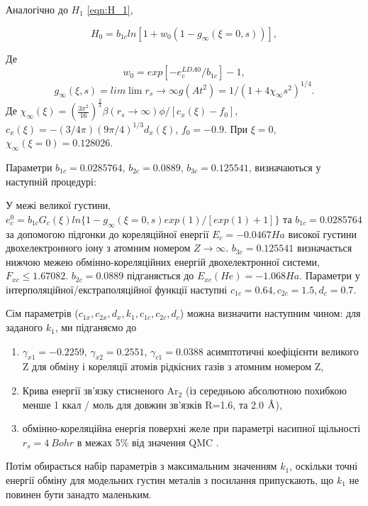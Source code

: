 Аналогічно до $H_1$ \ref{eqn:H_1}, 

\begin{equation}
	H_0 = b_{1c}ln[1+w_0(1 - g_\infty(\xi = 0, s))], 
\end{equation} 

Де 
\begin{equation}
	w_0 = exp[-e_c^{LDA0}/b_{1c}]-1,
\end{equation}
\begin{equation}
	g_\infty(\xi,s) = lim\lim{r_s \rightarrow \infty}g(At^2) = 1 / (1 + 4\chi_\infty s^2)^{1/4}.
\end{equation}
Де $\chi_\infty(\xi) = \left(\frac{3\pi^2}{16}\right)^{\frac{2}{3}}\beta(r_s \rightarrow \infty)\phi/[c_x(\xi)-f_0]$, $c_x(\xi) = -(3/4\pi)(9\pi/4)^{1/3}d_x(\xi)$, $f_0 = -0.9$. При $\xi = 0$, $ \chi_\infty(\xi = 0) = 0.128026$.

Параметри $b_{1c} = 0.0285764$, $b_{2c} = 0.0889$, $b_{3c} = 0.125541$, визначаються у наступній процедурі:

У межі великої густини, $e_c^0 = b_{1c}G_c(\xi)ln\{1 - g_\infty(\xi = 0, s)exp(1)/[exp(1)+1]\}$ та $b_{1c} = 0.0285764$ за допомогою підгонки до кореляційної енергії $E_c = -0.0467 Ha$ високої густини двохелектронного іону з атомним номером $Z \rightarrow \infty$. $b_{3c} = 0.125541$ визначається нижчою межею обмінно-кореляційних енергій двохелектронної системи, $F_{xc} \leq 1.67082$. $b_{2c} = 0.0889$ підганяється до $E_{xc}(He) = -1.068 Ha$. Параметри у інтерполяційної/екстраполяційної функції наступні $c_{1c} = 0.64, c_{2c} = 1.5, d_c = 0.7$.

Сім параметрів ($c_{1x}, c_{2x}, d_x, k_1, c_{1c}, c_{2c}, d_c$) можна визначити наступним чином: для заданого $k_1$, ми підганяємо до 
\begin{enumerate}
    \item $\gamma_{x1} = -0.2259$, $\gamma_{x2} = 0.2551$, $\gamma_{c1} = 0.0388$ асимптотичні коефіцієнти великого Z для обміну і кореляції атомів рідкісних газів з атомним номером Z,
    \item Крива енергії зв'язку стисненого Ar$_2$ (із середньою абсолютною похибкою менше 1 ккал / моль для довжин зв'язків R=1.6, та 2.0 $\text{\normalfont\AA}$),
    \item обмінно-кореляційна енергія поверхні желе при параметрі насипної щільності $r_s = 4 \ Bohr$ в межах 5\% від значення QMC \cite{PhysRevB.76}.
\end{enumerate}

Потім обирається набір параметрів з максимальним значенням $k_1$, оскільки точні енергії обміну для модельних густин металів з посилання \cite{PhysRevB.54} припускають, що $k_1$ не повинен бути занадто маленьким.

